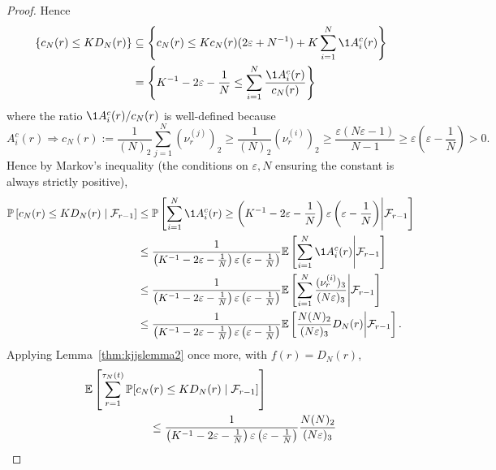 \begin{proof}
Hence%
\begin{align*}
\left\{ c_N(r) \leq K D_N(r) \right\}
&\subseteq \left\{ c_N(r) \leq K c_N(r) (2\varepsilon + N^{-1}) 
        + K \sum_{i=1}^N \1{A_i^c(r)} \right\} \\
&=\left\{ K^{-1} - 2\varepsilon- \frac{1}{N} \leq 
        \sum_{i=1}^N \frac{ \1{A_i^c(r)} }{ c_N(r) } \right\} 
\end{align*}
where the ratio $\1{A_i^c(r)} / c_N(r)$ is well-defined because
\begin{equation*}
A_i^c(r) 
\Rightarrow c_N(r) 
:= \frac{1}{(N)_2} \sum_{j=1}^N (\nu_r^{(j)})_2
\geq \frac{1}{(N)_2} (\nu_r^{(i)})_2
\geq \frac{\varepsilon (N\varepsilon-1)}{N-1}
\geq \varepsilon \left( \varepsilon - \frac{1}{N} \right)
>0 .
\end{equation*}
Hence by Markov's inequality (the conditions on $\varepsilon, N$ ensuring the constant is always strictly positive),
\begin{align*}
\Prob\left[ c_N(r) \leq K D_N(r) \mid \mathcal{F}_{r-1} \right]
&\leq \Prob\left[ \sum_{i=1}^N \1{A_i^c(r)} \geq 
        \left( K^{-1} - 2\varepsilon- \frac{1}{N} \right) \varepsilon 
        \left( \varepsilon-\frac{1}{N} \right) 
        \middle| \mathcal{F}_{r-1} \right] \\
&\leq \frac{1}{\left( K^{-1} - 2\varepsilon- \frac{1}{N} \right) \varepsilon 
        \left( \varepsilon-\frac{1}{N} \right)} 
        \E\left[ \sum_{i=1}^N \1{A_i^c(r)} 
        \middle| \mathcal{F}_{r-1} \right] \\
&\leq \frac{1}{\left( K^{-1} - 2\varepsilon- \frac{1}{N} \right) \varepsilon 
        \left( \varepsilon-\frac{1}{N} \right)} 
        \E\left[ \sum_{i=1}^N \frac{(\nu_r^{(i)})_3}{(N\varepsilon)_3}
        \middle| \mathcal{F}_{r-1} \right] \\
&\leq \frac{1}{\left( K^{-1} - 2\varepsilon- \frac{1}{N} \right) \varepsilon 
        \left( \varepsilon-\frac{1}{N} \right)} 
        \E\left[ \frac{N(N)_2}{(N\varepsilon)_3} D_N(r)
        \middle| \mathcal{F}_{r-1} \right] .
\end{align*}
Applying Lemma~\ref{thm:kjjslemma2} once more, with $f(r) = D_N(r)$,
\begin{align*}
&\E \left[ \sum_{r=1}^{\tau_N(t)} \Prob[ c_N(r) \leq K D_N(r) 
        \mid \mathcal{F}_{r-1} ] \right] \\
&\hspace{2cm}\leq \frac{1}{\left( K^{-1} - 2\varepsilon- \frac{1}{N} \right) \varepsilon 
        \left( \varepsilon-\frac{1}{N} \right)} \frac{N(N)_2}{(N\varepsilon)_3}

\end{align*}
\end{proof}
